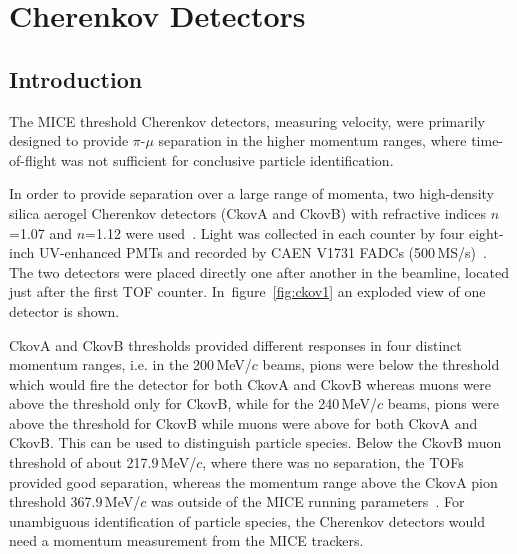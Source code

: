 \graphicspath{{03-Ckov/Figures/}}

\section{Cherenkov Detectors}
\label{Sect:Ckov}

\subsection{Introduction}
\label{SubSect:Ckov_Intro}

The MICE threshold Cherenkov detectors, measuring velocity, were primarily designed to provide $\pi$-$\mu$ separation in the higher momentum ranges, where time-of-flight was not sufficient for conclusive particle identification.

In order to provide separation over a large range of momenta, two high-density silica aerogel Cherenkov detectors (CkovA and CkovB) with refractive indices $n$=1.07 and $n$=1.12 were used~\cite{Cremaldi:2009zj}.
Light was collected in each counter by four eight-inch UV-enhanced PMTs and recorded by CAEN V1731 FADCs (500\,MS/s)~\cite{NOTE473}.
The two detectors were placed directly one after another in the beamline, located just after the first TOF counter. In~figure~\ref{fig:ckov1} an exploded view of one detector is shown.

CkovA and CkovB thresholds provided different responses in four distinct momentum ranges, i.e. in the 200\,MeV/$c$ beams, pions were below the threshold which would fire the detector for both CkovA and CkovB whereas muons were above the threshold only for CkovB, while for the 240\,MeV/$c$ beams, pions were above the threshold for CkovB while muons were above for both CkovA and CkovB.
This can be used to distinguish particle species.
Below the CkovB muon threshold of about 217.9\,MeV/$c$, where there was no separation, the TOFs provided good separation, whereas the momentum range above the CkovA pion threshold 367.9\,MeV/$c$ was outside of the MICE running parameters~\cite{NOTE473}.
For unambiguous identification of particle species, the Cherenkov detectors would need a momentum measurement from the MICE trackers.

